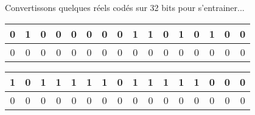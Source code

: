 \documentclass[12pt]{article}
\begin{document}
		\begin{MonExo}
		Convertissons quelques réels codés sur 32 bits pour s'entrainer...
		\begin{alphenum}
			\item
				\begin{tabular}{|c|c|c|c|c|c|c|c|c|c|c|c|c|c|c|c|} %
					\hline
					0&1&0&0&0&0&0&0&1&1&0&1&0&1&0&0 \\
					\hline
					0&0&0&0&0&0&0&0&0&0&0&0&0&0&0&0 \\
					\hline
				\end{tabular}
			\item
				\begin{tabular}{|c|c|c|c|c|c|c|c|c|c|c|c|c|c|c|c|} %
					\hline
					1&0&1&1&1&1&1&0&1&1&1&1&1&0&0&0 \\
					\hline
					0&0&0&0&0&0&0&0&0&0&0&0&0&0&0&0 \\
					\hline
				\end{tabular}
		\end{alphenum}
	\end{MonExo}
\end{document}
